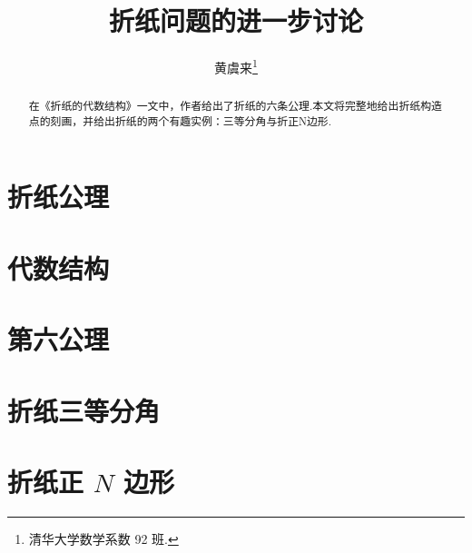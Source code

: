 \documentclass[twoside]{article}
\begin{document}
\title{折纸问题的进一步讨论}
\author{黄虞来\footnote{清华大学数学系数 92 班.}}

\begin{abstract}
    在《折纸的代数结构》\cite{Hesi}一文中，作者给出了折纸的六条公理.本文将完整地给出折纸构造点的刻画，并给出折纸的两个有趣实例：三等分角与折正N边形.
\end{abstract}

\section{折纸公理}



\section{代数结构}



\section{第六公理}



\section{折纸三等分角}



\section{折纸正 \texorpdfstring{$N$}{N} 边形}



\printbibliography
\end{document}
